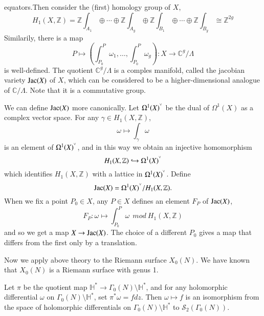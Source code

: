 \documentclass[11pt]{article}
\begin{document}
equators.Then consider the (first) homology group of $X$,
\begin{equation*}
    H_1(X,\mathbb{Z})=\mathbb{Z}\int_{A_1}\oplus\cdots \oplus \mathbb{Z}\int_{A_g}\oplus \mathbb{Z}\int_{B_1}\oplus\cdots \oplus \mathbb{Z}\int_{B_g}
    \cong \mathbb{Z}^{2g}
\end{equation*}
Similarily, there is a map
\begin{equation*}
    P\mapsto (\int_{P_0}^{P}\omega_1,\ldots,\int_{P_0}^{P}\omega_g):X\rightarrow \mathbb{C}^g/\Lambda
\end{equation*}
is well-defined. The quotient $\mathbb{C}^g/\Lambda$ is a comples manifold, called the jacobian variety ${\rm Jac}(X)$ of $X$, which
can be considered to be a higher-dimensional analogue of $\mathbb{C}/\Lambda$. Note that it is a commutative group.\par
We can define ${\rm Jac}(X)$ more canonically. Let $\Omega^1(X)^{\spcheck}$ be the dual of $\Omega^1(X)$ as a complex vector space.
For any $\gamma\in H_1(X,\mathbb{Z})$, 
\begin{equation*}
    \omega\mapsto\int_{\gamma}^{} \omega
\end{equation*}
is an element of $\Omega^1(X)^{\spcheck}$, and in this way we obtain an injective homomorphism
\begin{equation*}
    H_1(X,\mathbb{Z})\hookrightarrow \Omega^1(X)^{\spcheck}
\end{equation*}
which identifies $H_1(X,\mathbb{Z})$ with a lattice in $\Omega^1(X)^{\spcheck}$. Define 
\begin{equation*}
    {\rm Jac}(X)=\Omega^1(X)^{\spcheck}/H_1(X,\mathbb{Z}).
\end{equation*}
When we fix a point $P_0\in X$, any $P\in X$ defines an element $F_P$ of ${\rm Jac}(X)$,
\begin{equation*}
    F_P:\omega\mapsto \int_{P_0}^{P}\omega \ \ mod \ H_1(X,\mathbb{Z})
\end{equation*}
and so we get a map $X\rightarrow {\rm Jac}(X)$. The choice of a different $P_0$ gives a map that differs from the first only by a translation.\par

Now we apply above theory to the Riemann surface $X_0(N)$. We have known that $X_0(N)$ is a Riemann surface with genus 1. 
\begin{proposition}
    Let $\pi$ be the quotient map $\mathbb{H}^*\rightarrow\Gamma_0(N)\setminus \mathbb{H}^*$, and for any holomorphic differential 
    $\omega$ on $\Gamma_0(N)\setminus \mathbb{H}^*$, set $\pi^*\omega=fdz$. Then $\omega\mapsto f $ is an isomorphism from the space of holomorphic
    differentials on $\Gamma_0(N)\setminus \mathbb{H}^*$ to $\mathcal{S} _2 (\Gamma_0(N))$.
\end{proposition}
\end{document}
